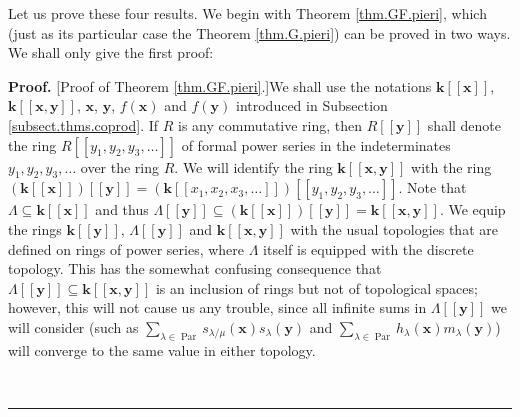 \documentclass[numbers=enddot,12pt,final,onecolumn,notitlepage]{scrartcl}%
\theoremstyle{definition}
\newenvironment{proof}[1][Proof]{\noindent\textbf{#1.} }{\ \rule{0.5em}{0.5em}}
\let\sumnonlimits\sum
\renewcommand{\sum}{\sumnonlimits\limits}
\newenvironment{verlong}{}{}
\begin{document}
\begin{verlong}
Let us prove these four results. We begin with Theorem \ref{thm.GF.pieri},
which (just as its particular case the Theorem \ref{thm.G.pieri}) can be
proved in two ways. We shall only give the first proof:

\begin{proof}
[Proof of Theorem \ref{thm.GF.pieri}.]We shall use the notations
$\mathbf{k}\left[  \left[  \mathbf{x}\right]  \right]  $, $\mathbf{k}\left[
\left[  \mathbf{x},\mathbf{y}\right]  \right]  $, $\mathbf{x}$, $\mathbf{y}$,
$f\left(  \mathbf{x}\right)  $ and $f\left(  \mathbf{y}\right)  $ introduced
in Subsection \ref{subsect.thms.coprod}. If $R$ is any commutative ring, then
$R\left[  \left[  \mathbf{y}\right]  \right]  $ shall denote the ring
$R\left[  \left[  y_{1},y_{2},y_{3},\ldots\right]  \right]  $ of formal power
series in the indeterminates $y_{1},y_{2},y_{3},\ldots$ over the ring $R$. We
will identify the ring $\mathbf{k}\left[  \left[  \mathbf{x},\mathbf{y}%
\right]  \right]  $ with the ring $\left(  \mathbf{k}\left[  \left[
\mathbf{x}\right]  \right]  \right)  \left[  \left[  \mathbf{y}\right]
\right]  =\left(  \mathbf{k}\left[  \left[  x_{1},x_{2},x_{3},\ldots\right]
\right]  \right)  \left[  \left[  y_{1},y_{2},y_{3},\ldots\right]  \right]  $.
Note that $\Lambda\subseteq\mathbf{k}\left[  \left[  \mathbf{x}\right]
\right]  $ and thus $\Lambda\left[  \left[  \mathbf{y}\right]  \right]
\subseteq\left(  \mathbf{k}\left[  \left[  \mathbf{x}\right]  \right]
\right)  \left[  \left[  \mathbf{y}\right]  \right]  =\mathbf{k}\left[
\left[  \mathbf{x},\mathbf{y}\right]  \right]  $. We equip the rings
$\mathbf{k}\left[  \left[  \mathbf{y}\right]  \right]  $, $\Lambda\left[
\left[  \mathbf{y}\right]  \right]  $ and $\mathbf{k}\left[  \left[
\mathbf{x},\mathbf{y}\right]  \right]  $ with the usual topologies that are
defined on rings of power series, where $\Lambda$ itself is equipped with the
discrete topology. This has the somewhat confusing consequence that
$\Lambda\left[  \left[  \mathbf{y}\right]  \right]  \subseteq\mathbf{k}\left[
\left[  \mathbf{x},\mathbf{y}\right]  \right]  $ is an inclusion of rings but
not of topological spaces; however, this will not cause us any trouble, since
all infinite sums in $\Lambda\left[  \left[  \mathbf{y}\right]  \right]  $ we
will consider (such as $\sum_{\lambda\in\operatorname*{Par}}s_{\lambda/\mu
}\left(  \mathbf{x}\right)  s_{\lambda}\left(  \mathbf{y}\right)  $ and
$\sum_{\lambda\in\operatorname*{Par}}h_{\lambda}\left(  \mathbf{x}\right)
m_{\lambda}\left(  \mathbf{y}\right)  $) will converge to the same value in
either topology.


\end{proof}
\end{verlong}
\end{document}
